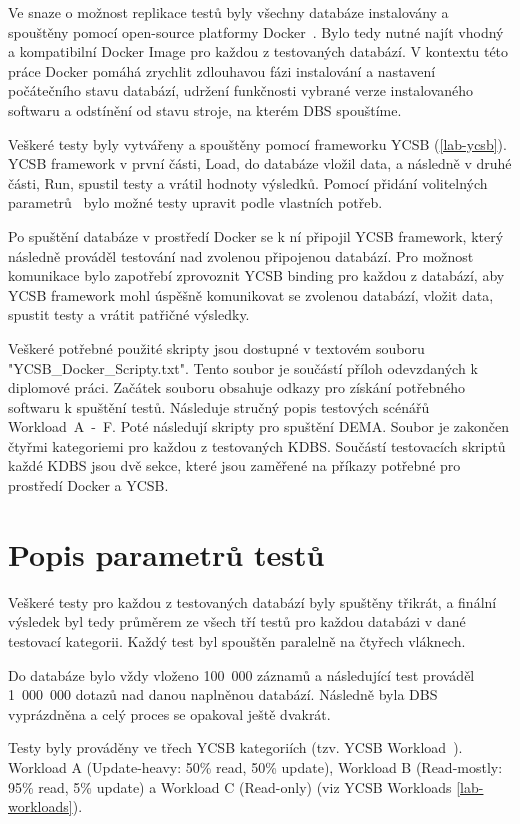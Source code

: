 \documentclass[czech,master,dept460,male,csharp,cpdeclaration]{diploma}
\begin{document}
	Ve snaze o možnost replikace testů byly všechny databáze instalovány a spouštěny pomocí open-source platformy Docker~\cite{docker}. Bylo tedy nutné najít vhodný a kompatibilní Docker Image pro každou z testovaných databází. V kontextu této práce Docker pomáhá zrychlit zdlouhavou fázi instalování a nastavení počátečního stavu databází, udržení funkčnosti vybrané verze instalovaného softwaru a odstínění od stavu stroje, na kterém DBS spouštíme.
	
	Veškeré testy byly vytvářeny a spouštěny pomocí frameworku YCSB (\ref{lab-ycsb}). YCSB framework v první části, Load, do databáze vložil data, a následně v druhé části, Run, spustil testy a vrátil hodnoty výsledků. Pomocí přidání volitelných parametrů~\cite{ycsb-properties} bylo možné testy upravit podle vlastních potřeb.
	
	Po spuštění databáze v prostředí Docker se k ní připojil YCSB framework, který následně prováděl testování nad zvolenou připojenou databází. Pro možnost komunikace bylo zapotřebí zprovoznit YCSB binding pro každou z databází, aby YCSB framework mohl úspěšně komunikovat se zvolenou databází, vložit data, spustit testy a vrátit patřičné výsledky.
	
	Veškeré potřebné použité skripty jsou dostupné v textovém souboru "YCSB\_Docker\_Scripty.txt". Tento soubor je součástí příloh odevzdaných k diplomové práci. Začátek souboru obsahuje odkazy pro získání potřebného softwaru k spuštění testů. Následuje stručný popis testových scénářů Workload~A~-~F. Poté následují skripty pro spuštění DEMA. Soubor je zakončen čtyřmi kategoriemi pro každou z testovaných KDBS. Součástí testovacích skriptů každé KDBS jsou dvě sekce, které jsou zaměřené na příkazy potřebné pro prostředí Docker a YCSB.
	
	\section{Popis parametrů testů}
	
	Veškeré testy pro každou z testovaných databází byly spuštěny třikrát, a finální výsledek byl tedy průměrem ze všech tří testů pro každou databázi v dané testovací kategorii. Každý test byl spouštěn paralelně na čtyřech vláknech.
	
	Do databáze bylo vždy vloženo 100~000 záznamů a následující test prováděl 1~000~000 dotazů nad danou naplněnou databází. Následně byla DBS vyprázdněna a celý proces se opakoval ještě dvakrát.
	
	Testy byly prováděny ve třech YCSB kategoriích (tzv. YCSB Workload~\cite{workloads}). Workload A (Update-heavy: 50\% read, 50\% update), Workload B (Read-mostly: 95\% read, 5\% update) a Workload C (Read-only) (viz YCSB Workloads \ref{lab-workloads}).
	
\end{document}
